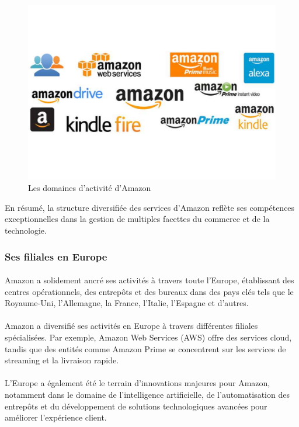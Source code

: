 \begin{figure}[htbp]
        \centering
        \includegraphics[width=0.8\linewidth]{./Graphismes-UTC/logos/Amazon/All-Things-Amazon.pdf}\hfill
        \caption{Les domaines d'activité d'Amazon \cite{products}}
    \end{figure}
En résumé, la structure diversifiée des services d'Amazon reflète ses compétences exceptionnelles dans la gestion de multiples facettes du commerce et de la technologie.


\subsubsection{Ses filiales en Europe}
\paragraph{}
\vspace{-2em}  %
Amazon a solidement ancré ses activités à travers toute l'Europe, établissant des centres opérationnels, des entrepôts et des bureaux dans des pays clés tels que le Royaume-Uni, l'Allemagne, la France, l'Italie, l'Espagne et d'autres.
\paragraph{}
\vspace{-2em}  %
Amazon a diversifié ses activités en Europe à travers différentes filiales spécialisées. Par exemple, Amazon Web Services (AWS) offre des services cloud, tandis que des entités comme Amazon Prime se concentrent sur les services de streaming et la livraison rapide.
\paragraph{}
\vspace{-2em}  %
L'Europe a également été le terrain d'innovations majeures pour Amazon, notamment dans le domaine de l'intelligence artificielle, de l'automatisation des entrepôts et du développement de solutions technologiques avancées pour améliorer l'expérience client.
